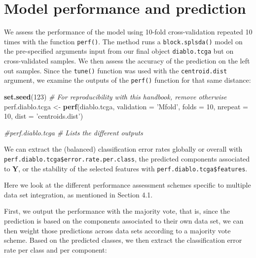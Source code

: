 \documentclass[]{book}
\newenvironment{Shaded}{\begin{snugshade}}{\end{snugshade}}
\newcommand{\CommentTok}[1]{\textcolor[rgb]{0.56,0.35,0.01}{\textit{#1}}}
\newcommand{\DataTypeTok}[1]{\textcolor[rgb]{0.13,0.29,0.53}{#1}}
\newcommand{\DecValTok}[1]{\textcolor[rgb]{0.00,0.00,0.81}{#1}}
\newcommand{\KeywordTok}[1]{\textcolor[rgb]{0.13,0.29,0.53}{\textbf{#1}}}
\newcommand{\NormalTok}[1]{#1}
\newcommand{\OperatorTok}[1]{\textcolor[rgb]{0.81,0.36,0.00}{\textbf{#1}}}
\newcommand{\StringTok}[1]{\textcolor[rgb]{0.31,0.60,0.02}{#1}}
\begin{document}
\hypertarget{diablo:perf}{%
\section{Model performance and prediction}\label{diablo:perf}}

We assess the performance of the model using 10-fold cross-validation repeated 10 times with the function \texttt{perf()}. The method runs a \texttt{block.splsda()} model on the pre-specified arguments input from our final object \texttt{diablo.tcga} but on cross-validated samples. We then assess the accuracy of the prediction on the left out samples. Since the \texttt{tune()} function was used with the \texttt{centroid.dist} argument, we examine the outputs of the \texttt{perf()} function for that same distance:

\begin{Shaded}
\begin{Highlighting}[]
\KeywordTok{set.seed}\NormalTok{(}\DecValTok{123}\NormalTok{) }\CommentTok{# For reproducibility with this handbook, remove otherwise}
\NormalTok{perf.diablo.tcga <-}\StringTok{ }\KeywordTok{perf}\NormalTok{(diablo.tcga,  }\DataTypeTok{validation =} \StringTok{'Mfold'}\NormalTok{, }\DataTypeTok{folds =} \DecValTok{10}\NormalTok{, }
                         \DataTypeTok{nrepeat =} \DecValTok{10}\NormalTok{, }\DataTypeTok{dist =} \StringTok{'centroids.dist'}\NormalTok{)}

\CommentTok{#perf.diablo.tcga  # Lists the different outputs}
\end{Highlighting}
\end{Shaded}

We can extract the (balanced) classification error rates globally or overall with
\texttt{perf.diablo.tcga\$error.rate.per.class}, the predicted components associated to \(\boldsymbol Y\), or the stability of the selected features with \texttt{perf.diablo.tcga\$features}.

Here we look at the different performance assessment schemes specific to multiple data set integration, as mentioned in Section 4.1.

First, we output the performance with the majority vote, that is, since the prediction is based on the components associated to their own data set, we can then weight those predictions across data sets according to a majority vote scheme. Based on the predicted classes, we then extract the classification error rate per class and per component:

\begin{Shaded}
\end{Shaded}
\end{document}
